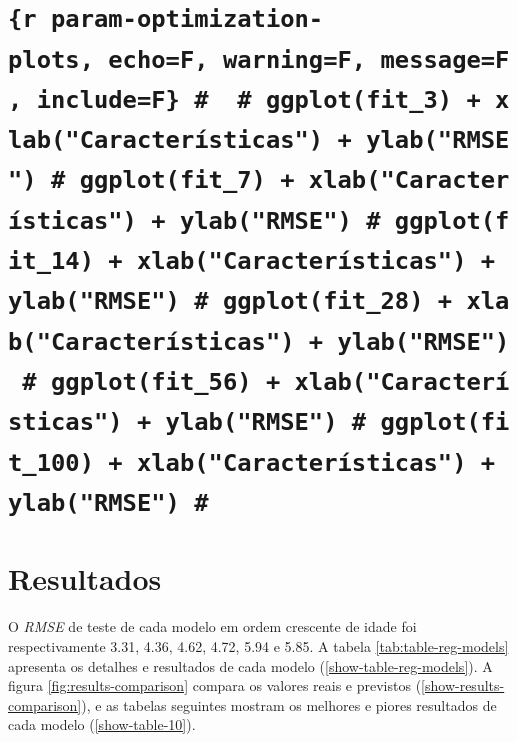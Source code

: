 \documentclass[]{article}
\begin{document}
\hypertarget{r-param-optimization-plots-echof-warningf-messagef-includef-ggplotfit_3-xlabcaracteruxedsticas-ylabrmse-ggplotfit_7-xlabcaracteruxedsticas-ylabrmse-ggplotfit_14-xlabcaracteruxedsticas-ylabrmse-ggplotfit_28-xlabcaracteruxedsticas-ylabrmse-ggplotfit_56-xlabcaracteruxedsticas-ylabrmse-ggplotfit_100-xlabcaracteruxedsticas-ylabrmse}{%
\section{\texorpdfstring{\texttt{\{r\ param-optimization-plots,\ echo=F,\ warning=F,\ message=F,\ include=F\}\ \#\ \ \#\ ggplot(fit\_3)\ +\ xlab("Características")\ +\ ylab("RMSE")\ \#\ ggplot(fit\_7)\ +\ xlab("Características")\ +\ ylab("RMSE")\ \#\ ggplot(fit\_14)\ +\ xlab("Características")\ +\ ylab("RMSE")\ \#\ ggplot(fit\_28)\ +\ xlab("Características")\ +\ ylab("RMSE")\ \#\ ggplot(fit\_56)\ +\ xlab("Características")\ +\ ylab("RMSE")\ \#\ ggplot(fit\_100)\ +\ xlab("Características")\ +\ ylab("RMSE")\ \#}}{\{r param-optimization-plots, echo=F, warning=F, message=F, include=F\} \#  \# ggplot(fit\_3) + xlab("Características") + ylab("RMSE") \# ggplot(fit\_7) + xlab("Características") + ylab("RMSE") \# ggplot(fit\_14) + xlab("Características") + ylab("RMSE") \# ggplot(fit\_28) + xlab("Características") + ylab("RMSE") \# ggplot(fit\_56) + xlab("Características") + ylab("RMSE") \# ggplot(fit\_100) + xlab("Características") + ylab("RMSE") \#}}\label{r-param-optimization-plots-echof-warningf-messagef-includef-ggplotfit_3-xlabcaracteruxedsticas-ylabrmse-ggplotfit_7-xlabcaracteruxedsticas-ylabrmse-ggplotfit_14-xlabcaracteruxedsticas-ylabrmse-ggplotfit_28-xlabcaracteruxedsticas-ylabrmse-ggplotfit_56-xlabcaracteruxedsticas-ylabrmse-ggplotfit_100-xlabcaracteruxedsticas-ylabrmse}}

\hypertarget{resultados}{%
\section{Resultados}\label{resultados}}

O \emph{RMSE} de teste de cada modelo em ordem crescente de idade foi
respectivamente 3.31, 4.36, 4.62, 4.72, 5.94 e 5.85. A tabela
\ref{tab:table-reg-models} apresenta os detalhes e resultados de cada
modelo (\ref{show-table-reg-models}). A figura
\ref{fig:results-comparison} compara os valores reais e previstos
(\ref{show-results-comparison}), e as tabelas seguintes mostram os
melhores e piores resultados de cada modelo (\ref{show-table-10}).
\end{document}
